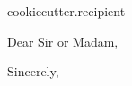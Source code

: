 \documentclass[a4paper]{scrlttr2}
\begin{document}
\begin{letter}{
  {{cookiecutter.recipient}}
}

\opening{Dear Sir or Madam,}

\thispagestyle{firststyle}

\lipsum

\bigskip
\bigskip
\closing{Sincerely,}

\end{letter}

\end{document}

